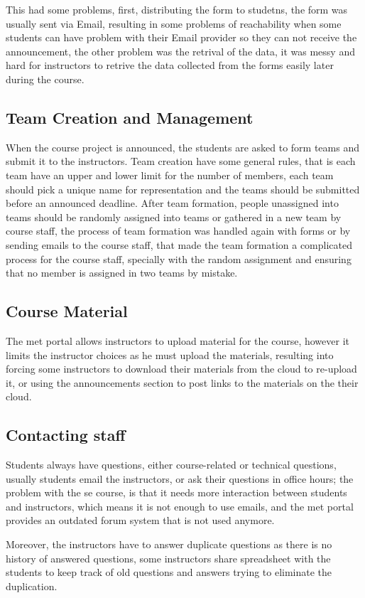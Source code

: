 \newParagraph
This had some problems, first, distributing the form to studetns, the form was usually sent via Email,
resulting in some problems of reachability when some students can have problem with their Email provider so they can not receive
the announcement, the other problem was the retrival of the data, it was messy and hard for instructors to retrive
the data collected from the forms easily later during the course.

\subsection{Team Creation and Management}
\label{sub:team-management}
When the course project is announced, the students are asked to form teams and submit it to the instructors. Team creation
have some general rules, that is each team have an upper and lower limit for the number of members, each team should pick
a unique name for representation and the teams should be submitted before an announced deadline. After team formation, people
unassigned into teams should be randomly assigned into teams or gathered in a new team by course staff, the process of team
formation was handled again with forms or by sending emails to the course staff, that made the team formation a complicated
process for the course staff, specially with the random assignment and ensuring that no member is assigned in two teams
by mistake.

\subsection{Course Material}
\label{sub:course-material}
The \ac{met} portal allows instructors to upload material for the course, however it limits the instructor choices as
he must upload the materials, resulting into forcing some instructors to download their materials from the cloud
to re-upload it, or using the announcements section to post links to the materials on the their cloud.

\subsection{Contacting staff}
\label{sub:contacting-staff}
Students always have questions, either course-related or technical questions, usually students email the instructors, or ask their questions
in office hours; the problem with the \ac{se} course, is that it needs more interaction between students and instructors, which means
it is not enough to use emails, and the \ac{met} portal provides an outdated forum system that is not used anymore.

\newParagraph
Moreover, the instructors have to answer duplicate questions as there is no history of answered questions, some instructors share
spreadsheet with the students to keep track of old questions and answers trying to eliminate the duplication. 
